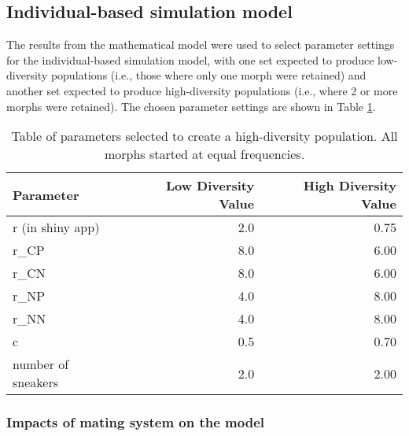 \documentclass[11pt,]{article}
\begin{document}
\hypertarget{individual-based-simulation-model-1}{%
\subsection{Individual-based simulation model}\label{individual-based-simulation-model-1}}

The results from the mathematical model were used to select parameter settings for the individual-based simulation model, with one set expected to produce low-diversity populations (i.e., those where only one morph were retained) and another set expected to produce high-diversity populations (i.e., where 2 or more morphs were retained). The chosen parameter settings are shown in Table \ref{tab:SimParamsTable}.

\begin{table}[H]

\caption{\label{tab:SimParamsTable}Table of parameters selected to create a high-diversity population. All morphs started at equal frequencies.}
\centering
\begin{tabular}[t]{lrr}
\toprule
Parameter & Low Diversity Value & High Diversity Value\\
\midrule
r (in shiny app) & 2.0 & 0.75\\
r\_CP & 8.0 & 6.00\\
r\_CN & 8.0 & 6.00\\
r\_NP & 4.0 & 8.00\\
r\_NN & 4.0 & 8.00\\
\addlinespace
c & 0.5 & 0.70\\
number of sneakers & 2.0 & 2.00\\
\bottomrule
\end{tabular}
\end{table}

\hypertarget{impacts-of-mating-system-on-the-model}{%
\subsubsection{Impacts of mating system on the model}\label{impacts-of-mating-system-on-the-model}}
\end{document}
